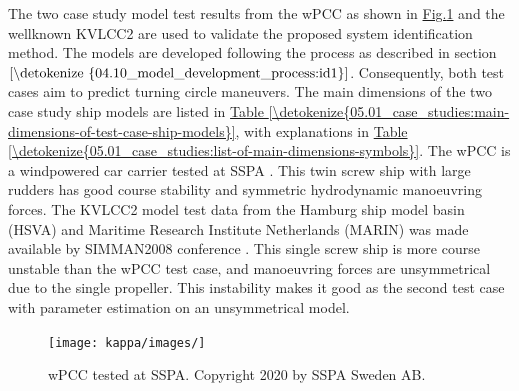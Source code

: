 The two case study model test results from the wPCC as shown in \hyperref[\detokenize{05.01_case_studies:wpcc-mdl}]{Fig.\@ \ref{\detokenize{05.01_case_studies:wpcc-mdl}}} and the well\sphinxhyphen{}known KVLCC2 are used to validate the proposed system identification method.
The models are developed following the process as described in section \(\ref{\detokenize{04.10_model_development_process:id1}}\). Consequently, both test cases aim to predict turning circle maneuvers. The main dimensions of the two case study ship models are listed in \hyperref[\detokenize{05.01_case_studies:main-dimensions-of-test-case-ship-models}]{Table \ref{\detokenize{05.01_case_studies:main-dimensions-of-test-case-ship-models}}}, with explanations in \hyperref[\detokenize{05.01_case_studies:list-of-main-dimensions-symbols}]{Table \ref{\detokenize{05.01_case_studies:list-of-main-dimensions-symbols}}}. The wPCC is a wind\sphinxhyphen{}powered car carrier tested at SSPA \cite{alexandersson_wpcc_2022}. This twin screw ship with large rudders has good course stability and symmetric hydrodynamic manoeuvring forces. The KVLCC2 model test data from the Hamburg ship model basin (HSVA) and Maritime Research Institute Netherlands (MARIN) was made available by SIMMAN2008 conference \cite{stern_experience_2011}. This single screw ship is more course unstable than the wPCC test case, and manoeuvring forces are unsymmetrical due to the single propeller. This instability makes it good as the second test case with parameter estimation on an unsymmetrical model.

\begin{figure}[H]
\centering

\texttt{[image: kappa/images/]}
\caption{wPCC tested at SSPA. Copyright 2020 by SSPA Sweden AB.}\label{\detokenize{05.01_case_studies:wpcc-mdl}}

\end{figure}


